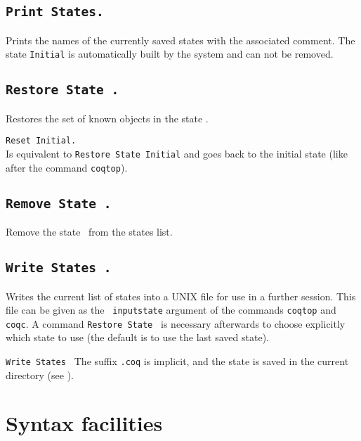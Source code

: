 \subsection{\tt Print States.}

Prints the names of the currently saved states with the associated
comment. The state {\tt Initial} is automatically built by the system
and can not be removed.

\subsection{\tt Restore State \ident.}
Restores the set of known objects in the state {\ident}.

\begin{Variants}
\item {\tt Reset Initial.}\\ 
  Is equivalent to {\tt Restore State Initial} and goes back to the
  initial state (like after the command {\tt coqtop}).
\end{Variants}

\subsection{\tt Remove State \ident.}
Remove the state \ident\ from the states list.

\subsection{\tt Write States \str.}
Writes the current list of states into a UNIX file  for
use in a further session. This file can be given as the {\tt
  inputstate} argument of the commands {\tt coqtop} and {\tt coqc}. A
command {\tt Restore State \ident} is necessary afterwards to choose
explicitly which state to use (the default is to use the last saved state).

\begin{Variants}
\item {\tt Write States \ident} The suffix \texttt{.coq} is implicit,
  and the state is saved in the current directory (see \pageref{Pwd}).
\end{Variants}

\section{Syntax facilities}

